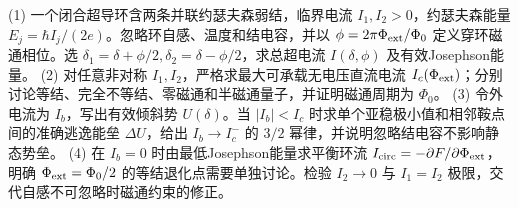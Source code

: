 (1) 一个闭合超导环含两条并联约瑟夫森弱结，临界电流 \(I_1,I_2>0\)，约瑟夫森能量 \(E_j=\hbar I_j/(2e)\)。忽略环自感、温度和结电容，并以 \(\phi=2\pi\Phi_{\rm ext}/\Phi_0\) 定义穿环磁通相位。选 \(\delta_1=\delta+\phi/2,\delta_2=\delta-\phi/2\)，求总超电流 \(I(\delta,\phi)\) 及有效Josephson能量。
(2) 对任意非对称 \(I_1,I_2\)，严格求最大可承载无电压直流电流 \(I_c(\Phi_{\rm ext})\)；分别讨论等结、完全不等结、零磁通和半磁通量子，并证明磁通周期为 \(\Phi_0\)。
(3) 令外电流为 \(I_b\)，写出有效倾斜势 \(U(\delta)\)。当 \(|I_b|<I_c\) 时求单个亚稳极小值和相邻鞍点间的准确逃逸能垒 \(\Delta U\)，给出 \(I_b\to I_c^{-}\) 的 \(3/2\) 幂律，并说明忽略结电容不影响静态势垒。
(4) 在 \(I_b=0\) 时由最低Josephson能量求平衡环流 \(I_{\rm circ}=-\partial F/\partial\Phi_{\rm ext}\)，明确 \(\Phi_{\rm ext}=\Phi_0/2\) 的等结退化点需要单独讨论。检验 \(I_2\to0\) 与 \(I_1=I_2\) 极限，交代自感不可忽略时磁通约束的修正。
